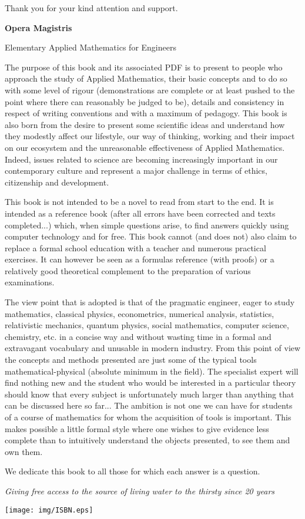 \documentclass[12pt,a4paper,twoside,openright]{report}
\theoremstyle{definition}
\theoremstyle{itexmp}
\numberwithin{equation}{section}
\begin{document}
	Thank you for your kind attention and support.
	
	\newpage\null\thispagestyle{empty}\newpage %
	\pagestyle{empty}
	\pagecolor{gray}
	{\Huge \textbf{Opera Magistris}}
	
	{\LARGE Elementary Applied Mathematics for Engineers}

	{\color{white}The purpose of this book and its associated PDF is to present to people who approach the study of Applied Mathematics, their basic concepts and to do so with some level of rigour (demonstrations are complete or at least pushed to the point where there can reasonably be judged to be), details and consistency in respect of writing conventions and with a maximum of pedagogy. This book is also born from the desire to present some scientific ideas and understand how they modestly affect our lifestyle, our way of thinking, working and their impact on our ecosystem and the unreasonable effectiveness of Applied Mathematics. Indeed, issues related to science are becoming increasingly important in our contemporary culture and represent a major challenge in terms of ethics, citizenship and development.

	This book is not intended to be a novel to read from start to the end. It is intended as a reference book (after all errors have been corrected and texts completed...) which, when simple questions arise, to find answers quickly using computer technology and for free. This book cannot (and does not) also claim to replace a formal school education with a teacher and numerous practical exercises. It can however be seen as a formulas reference (with proofs) or a relatively good theoretical complement to the preparation of various examinations.

	The view point that is adopted is that of the pragmatic engineer, eager to study mathematics, classical physics, econometrics, numerical analysis, statistics, relativistic mechanics, quantum physics, social mathematics, computer science, chemistry, etc. in a concise way and without wasting time in a formal and extravagant vocabulary and unusable in modern industry. From this point of view the concepts and methods presented are just some of the typical tools mathematical-physical (absolute minimum in the field). The specialist expert will find nothing new and the student who would be interested in a particular theory should know that every subject is unfortunately much larger than anything that can be discussed here so far... The ambition is not one we can have for students of a course of mathematics for whom the acquisition of tools is important. This makes possible a little formal style where one wishes to give evidence less complete than to intuitively understand the objects presented, to see them and own them.

	We dedicate this book to all those for which each answer is a question.

\begin{flushright}
\textit{Giving free access to the source of living water to the thirsty since 20  years}\end{flushright}}


\begin{flushright}
\texttt{[image: img/ISBN.eps]} 
\end{flushright}
\end{document}
